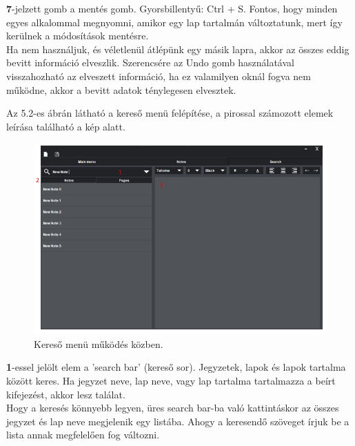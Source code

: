 \vspace{5pt} \noindent \textbf{7}-jelzett gomb a mentés gomb. Gyorsbillentyű: Ctrl + S. Fontos, hogy minden egyes alkalommal megnyomni, amikor egy lap tartalmán változtatunk, mert így kerülnek a módosítások mentésre. 
\vspace{5pt} \\Ha nem használjuk, és véletlenül átlépünk egy másik lapra, akkor az összes eddig bevitt információ elveszlik. Szerencsére az Undo gomb használatával visszahozható az elveszett információ, ha ez valamilyen oknál fogva nem működne, akkor a bevitt adatok ténylegesen elvesztek.



\newpage {}

Az 5.2-es ábrán látható a kereső menü felépítése, a pirossal számozott elemek leírása található a kép alatt.

\begin{figure}[h]
	\centering
	\includegraphics[scale=0.5]{images/doc_4.png}
	\caption{Kereső menü működés közben.}
	\label{fig:menu_search_2}
\end{figure}

\vspace{5pt} \noindent \textbf{1}-essel jelölt elem a ’search bar’ (kereső sor). Jegyzetek, lapok és lapok tartalma között keres. Ha jegyzet neve, lap neve, vagy lap tartalma tartalmazza a beírt kifejezést, akkor lesz találat. 
\vspace{5pt} \\Hogy a keresés könnyebb legyen, üres search bar-ba való kattintáskor az összes jegyzet és lap neve megjelenik egy listába. Ahogy a keresendő szöveget írjuk be a lista annak megfelelően fog változni. 

